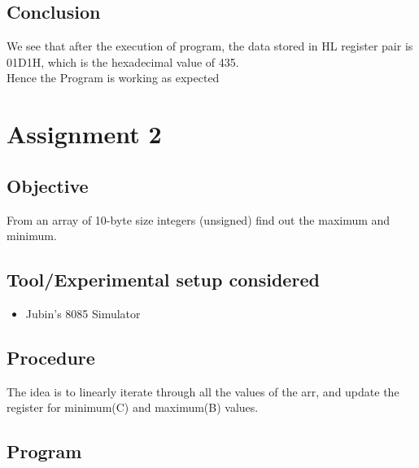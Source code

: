 \documentclass[a4paper]{article} %
\begin{document}
\subsection{Conclusion}
We see that after the execution of program, the data stored in HL register pair is 01D1H, which is the hexadecimal value of 435.\\
Hence the Program is working as expected
\newpage

\section[Find minimum and maximum number in 10-byte unsigned array]{Assignment 2} %
\subsection{Objective}
From an array of 10-byte size integers (unsigned) find out the maximum and minimum.
\subsection{Tool/Experimental setup considered}
\begin{itemize}
    \item Jubin's 8085 Simulator
\end{itemize}
\subsection{Procedure}
The idea is to linearly iterate through all the values of the arr, and update the register for minimum(C) and maximum(B) values.
\subsection{Program}

\end{document}
